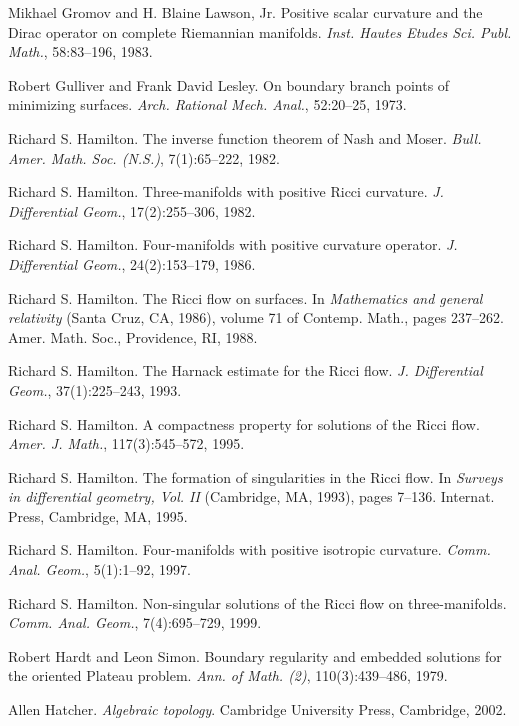 \begin{thebibliography}{99}
    Mikhael Gromov and H. Blaine Lawson, Jr. Positive scalar curvature and the Dirac operator on complete Riemannian manifolds. \textit{Inst. Hautes Etudes Sci. Publ. Math.}, 58:83–196, 1983.

    Robert Gulliver and Frank David Lesley. On boundary branch points of minimizing surfaces. \textit{Arch. Rational Mech. Anal.}, 52:20–25, 1973.

    Richard S. Hamilton. The inverse function theorem of Nash and Moser. \textit{Bull. Amer. Math. Soc. (N.S.)}, 7(1):65–222, 1982.

    Richard S. Hamilton. Three-manifolds with positive Ricci curvature. \textit{J. Differential Geom.}, 17(2):255–306, 1982.

    Richard S. Hamilton. Four-manifolds with positive curvature operator. \textit{J. Differential Geom.}, 24(2):153–179, 1986.

    Richard S. Hamilton. The Ricci flow on surfaces. In \textit{Mathematics and general relativity} (Santa Cruz, CA, 1986), volume 71 of Contemp. Math., pages 237–262. Amer. Math. Soc., Providence, RI, 1988.

    Richard S. Hamilton. The Harnack estimate for the Ricci flow. \textit{J. Differential Geom.}, 37(1):225–243, 1993.

    Richard S. Hamilton. A compactness property for solutions of the Ricci flow. \textit{Amer. J. Math.}, 117(3):545–572, 1995.

    Richard S. Hamilton. The formation of singularities in the Ricci flow. In \textit{Surveys in differential geometry, Vol. II} (Cambridge, MA, 1993), pages 7–136. Internat. Press, Cambridge, MA, 1995.

    Richard S. Hamilton. Four-manifolds with positive isotropic curvature. \textit{Comm. Anal. Geom.}, 5(1):1–92, 1997.

    Richard S. Hamilton. Non-singular solutions of the Ricci flow on three-manifolds. \textit{Comm. Anal. Geom.}, 7(4):695–729, 1999.

    Robert Hardt and Leon Simon. Boundary regularity and embedded solutions for the oriented Plateau problem. \textit{Ann. of Math. (2)}, 110(3):439–486, 1979.

    Allen Hatcher. \textit{Algebraic topology}. Cambridge University Press, Cambridge, 2002.


\end{thebibliography}
